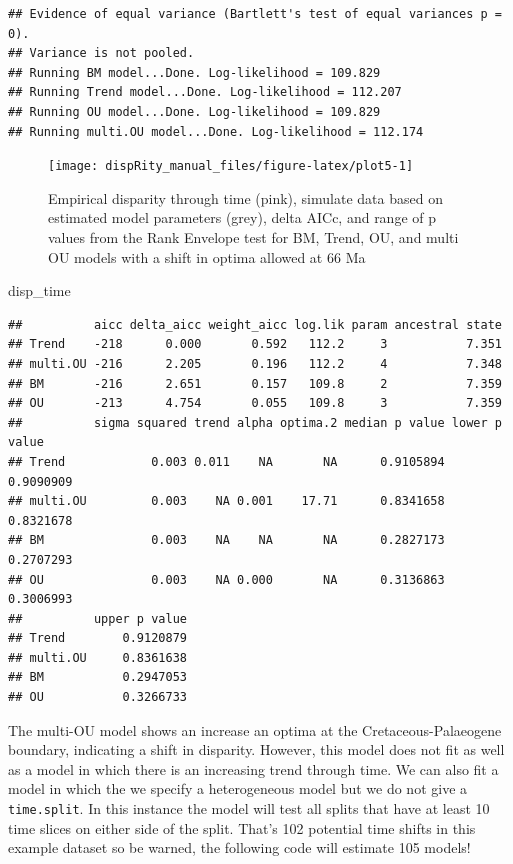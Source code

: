 \documentclass[]{book}
\newenvironment{Shaded}{\begin{snugshade}}{\end{snugshade}}
\newcommand{\NormalTok}[1]{#1}
\begin{document}
\begin{verbatim}
## Evidence of equal variance (Bartlett's test of equal variances p = 0).
## Variance is not pooled.
## Running BM model...Done. Log-likelihood = 109.829
## Running Trend model...Done. Log-likelihood = 112.207
## Running OU model...Done. Log-likelihood = 109.829
## Running multi.OU model...Done. Log-likelihood = 112.174
\end{verbatim}

\begin{figure}

{\centering \texttt{[image: dispRity\_manual\_files/figure-latex/plot5-1]} 

}

\caption{Empirical disparity through time (pink), simulate data based on estimated model parameters (grey), delta AICc, and range of p values from the Rank Envelope test for BM, Trend, OU, and multi OU models with a shift in optima allowed at 66 Ma}\label{fig:plot5}
\end{figure}

\begin{Shaded}
\begin{Highlighting}[]
\NormalTok{disp_time}
\end{Highlighting}
\end{Shaded}

\begin{verbatim}
##          aicc delta_aicc weight_aicc log.lik param ancestral state
## Trend    -218      0.000       0.592   112.2     3           7.351
## multi.OU -216      2.205       0.196   112.2     4           7.348
## BM       -216      2.651       0.157   109.8     2           7.359
## OU       -213      4.754       0.055   109.8     3           7.359
##          sigma squared trend alpha optima.2 median p value lower p value
## Trend            0.003 0.011    NA       NA      0.9105894     0.9090909
## multi.OU         0.003    NA 0.001    17.71      0.8341658     0.8321678
## BM               0.003    NA    NA       NA      0.2827173     0.2707293
## OU               0.003    NA 0.000       NA      0.3136863     0.3006993
##          upper p value
## Trend        0.9120879
## multi.OU     0.8361638
## BM           0.2947053
## OU           0.3266733
\end{verbatim}

The multi-OU model shows an increase an optima at the Cretaceous-Palaeogene boundary, indicating a shift in disparity.
However, this model does not fit as well as a model in which there is an increasing trend through time.
We can also fit a model in which the we specify a heterogeneous model but we do not give a \texttt{time.split}.
In this instance the model will test all splits that have at least 10 time slices on either side of the split.
That's 102 potential time shifts in this example dataset so be warned, the following code will estimate 105 models!
\end{document}
